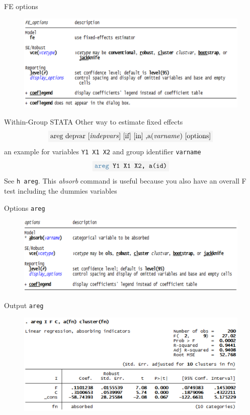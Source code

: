 \begin{frame}{FE options}
	\begin{figure}
		\centering
			\includegraphics[width = 0.9\linewidth]{figures/panel_02.png}
	\end{figure}
\end{frame}
\begin{frame}{Within-Group STATA}
	Other way to estimate fixed effects
		$$\colorbox{codegray}{areg depvar [\textit{indepvars}] [if] [in] ,a(\textit{varname}) [options]}$$
	an example for variables \texttt{Y1 X1 X2} and group identifier \texttt{varname}
		$$\colorbox{codegray}{\texttt{\textcolor{codeblue}{areg} Y1 X1 X2, a(id)}}$$
	See \colorbox{codegray}{\textcolor{codeblue}{\texttt{h areg}}}. This \emph{absorb} command is useful because you also have an overall F test including the dummies variables
\end{frame}
\begin{frame}{Options}
	\colorbox{codegray}{\textcolor{codeblue}{\texttt{areg}}}
		\begin{figure}
			\centering
			\includegraphics[width = 0.9\linewidth]{figures/panel_03.png}
		\end{figure}
\end{frame}
\begin{frame}{Output}
	\colorbox{codegray}{\textcolor{codeblue}{\texttt{areg}}}
		\begin{figure}
			\centering
			\includegraphics[width = 0.9\linewidth]{figures/panel_04.png}
		\end{figure}
\end{frame}
